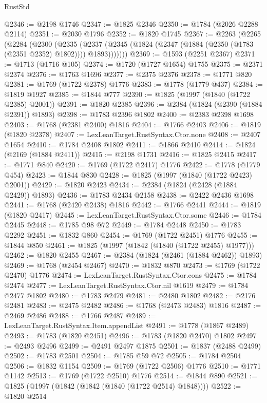 \begin{lexlean}{RustStd}
\begin{coremodule}
{\begin{coremodule}
{{{{{{{{{{{{{{{{{{{{{{{{{{{{{{{{{{{{{{{{{{{{{{{@2346 := @2198 @1746
@2347 := @1825 @2346
@2350 := @1784 (@2026 @2288 @2114)
@2351 := @2030 @1796
@2352 := @1820 @1745
@2367 := @2263
    (@2265
      (@2284
        (@2300
          (@2335
            (@2337 (@2345 (@1824 (@2347 (@1884 (@2350 (@1783 (@2351 @2352) @1802)))) @1893)))))))
@2369 := @1593 (@2251 @2367)
@2371 := @1713 (@1716 @105)
@2374 := @1720 (@1727 @1654) @1755
@2375 := @2371 @2374
@2376 := @1763 @1696
@2377 := @2375 @2376
@2378 := @1771 @820
@2381 := @1769 (@1722 @2378) @1776
@2383 := @1778 (@1779 @437)
@2384 := @1819 @1927
@2385 := @1844 @777
@2390 := @1825 (@1997 (@1840 (@1722 @2385) @2001))
@2391 := @1820 @2385
@2396 := @2384 (@1824 (@2390 (@1884 @2391)) @1893)
@2398 := @1783 @2396 @1802
@2400 := @2383 @2398 @1698
@2403 := @1768 (@2381 @2400) @1816
@2404 := @1766 @2403
@2406 := @1819 (@1820 @2378)
@2407 := LexLeanTarget.RustSyntax.Ctor.none
@2408 := @2407 @1654
@2410 := @1784 @2408 @1802
@2411 := @1866 @2410
@2414 := @1824 (@2169 (@1884 @2411))
@2415 := @2198 @1731
@2416 := @1825 @2415
@2417 := @1771 @840
@2420 := @1769 (@1722 @2417) @1776
@2422 := @1778 (@1779 @454)
@2423 := @1844 @830
@2428 := @1825 (@1997 (@1840 (@1722 @2423) @2001))
@2429 := @1820 @2423
@2434 := @2384 (@1824 (@2428 (@1884 @2429)) @1893)
@2436 := @1783 @2434 @2158
@2438 := @2422 @2436 @1698
@2441 := @1768 (@2420 @2438) @1816
@2442 := @1766 @2441
@2444 := @1819 (@1820 @2417)
@2445 := LexLeanTarget.RustSyntax.Ctor.some
@2446 := @1784 @2445
@2448 := @1785 @98 @72
@2449 := @1784 @2448
@2450 := @1783 @2292
@2451 := @1832 @860
@2454 := @1769 (@1722 @2451) @1776
@2455 := @1844 @850
@2461 := @1825 (@1997 (@1842 (@1840 (@1722 @2455) @1977)))
@2462 := @1820 @2455
@2467 := @2384 (@1824 (@2461 (@1884 @2462)) @1893)
@2469 := @1768 (@2454 @2467)
@2470 := @1832 @870
@2473 := @1769 (@1722 @2470) @1776
@2474 := LexLeanTarget.RustSyntax.Ctor.cons
@2475 := @1784 @2474
@2477 := LexLeanTarget.RustSyntax.Ctor.nil @1619
@2479 := @1784 @2477 @1802
@2480 := @1783 @2479
@2481 := @2480 @1802
@2482 := @2176 @2481
@2483 := @2475 @2482
@2486 := @1768 (@2473 @2483) @1816
@2487 := @2469 @2486
@2488 := @1766 @2487
@2489 := LexLeanTarget.RustSyntax.Item.appendList
@2491 := @1778 (@1867 @2489)
@2493 := @1783 (@1820 @2451)
@2496 := @1783 (@1820 @2470) @1802
@2497 := @2493 @2496
@2499 := @2491 @2497 @1875
@2501 := @1837 (@2488 @2499)
@2502 := @1783 @2501
@2504 := @1785 @59 @72
@2505 := @1784 @2504
@2506 := @1832 @1154
@2509 := @1769 (@1722 @2506) @1776
@2510 := @1771 @1142
@2513 := @1769 (@1722 @2510) @1776
@2514 := @1844 @890
@2521 := @1825 (@1997 (@1842 (@1842 (@1840 (@1722 @2514) @1848))))
@2522 := @1820 @2514
}}}}}}}}}}}}}}}}}}}}}}}}}}}}}}}}}}}}}}}}}}}}}}}
\end{coremodule}}
\end{coremodule}
\end{lexlean}
